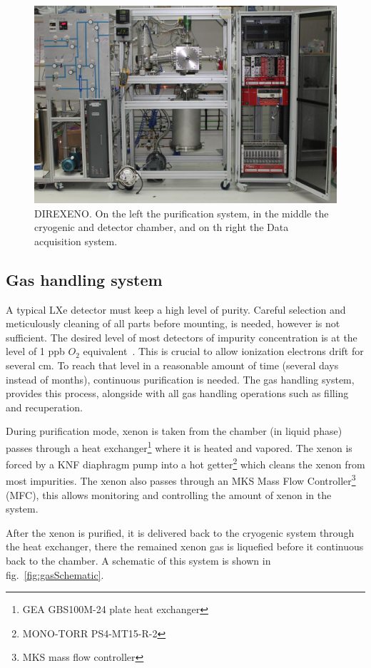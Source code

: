 \begin{figure}[t!]
\centerline{\includegraphics[width=0.8\linewidth]{FullDet.jpg}}
\caption{DIREXENO. On the left the purification system, in the middle the cryogenic and detector chamber, and on th right the Data acquisition system.}
\label{fig:fulldet}
\end{figure}

\subsection{Gas handling system}
\label{subsec:gas}

A typical LXe detector must keep a high level of purity. Careful selection and meticulously cleaning of all parts before mounting, 
is needed, however is not sufficient. The desired level of most detectors of impurity concentration is at the level of 1 ppb $O_2$ 
equivalent~\cite{Aprile:2009dv}. This is crucial to allow ionization electrons drift for several cm. To reach that level in a 
reasonable amount of time (several days instead of months), continuous purification is needed. The gas handling system, provides this process, 
alongside with all gas handling operations such as filling and recuperation.

During purification mode, xenon is taken from the chamber (in liquid phase)
passes through a heat exchanger\footnote{GEA GBS100M-24 plate heat exchanger} where it is heated and vapored. The xenon is forced 
by a KNF diaphragm pump into a hot getter\footnote{MONO-TORR
PS4-MT15-R-2} which cleans the xenon from most impurities. The xenon
also passes through an MKS Mass Flow Controller\footnote{MKS mass flow controller} (MFC), this allows monitoring and controlling the amount of xenon in the system. 

After the xenon is purified, it is delivered back to the cryogenic system through the heat exchanger, there the remained xenon gas is 
liquefied before it continuous back to the chamber. A schematic of this system is shown in fig.~\ref{fig:gasSchematic}.


